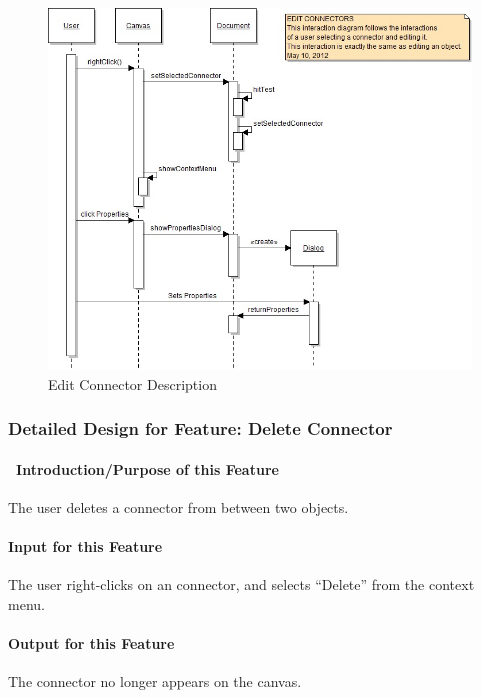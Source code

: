 \documentclass[twoside,letterpaper]{article}
\begin{document}
{\begin{figure}[h]
\centering
\includegraphics[width=6.0in]{IntEditConn.jpg}
\caption{Edit Connector Description}
\end{figure}

\clearpage



% 
%

\subsubsection{Detailed Design for Feature: Delete Connector}

\paragraph[\ Introduction/Purpose of this Feature]
{\ Introduction/Purpose of this Feature}
{
The user deletes a connector from between two objects.
}

\paragraph[Input for this Feature]{Input for this Feature}
{
The user right-clicks on an connector, and selects ``Delete'' from the context menu.
}

\paragraph{Output for this Feature}
{
The connector no longer appears on the canvas.
}

}
\end{document}
